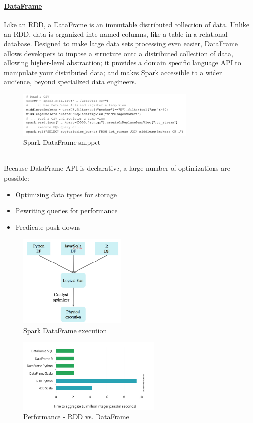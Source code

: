 \documentclass[10pt,a4paper]{article}
\begin{document}
 \paragraph{\uline{DataFrame}}
 Like an RDD, a DataFrame is an immutable distributed collection of data. Unlike an RDD, data is organized into named columns, like a table in a relational database. Designed to make large data sets processing even easier, DataFrame allows developers to impose a structure onto a distributed collection of data, allowing higher-level abstraction; it provides a domain specific language API to manipulate your distributed data; and makes Spark accessible to a wider audience, beyond specialized data engineers.
 \begin{figure}[ht!]
 \hfill \includegraphics[width=250pt]{images/spark-dataframe-snippet}
 \hspace*{\fill}
 \caption{Spark DataFrame snippet}
 \end{figure}  \\
 Because DataFrame API is declarative, a large number of optimizations are possible: 
 \begin{itemize}
 	\item Optimizing data types for storage
 	\item Rewriting queries for performance
 	\item Predicate push downs
 \end{itemize}
 \begin{figure}[ht!]
 \hfill \includegraphics[width=150pt]{images/spark-dataframe-exec}
 \hspace*{\fill}
 \caption{Spark DataFrame execution}
 \end{figure} 
  \begin{figure}[ht!]
 \hfill \includegraphics[width=200pt]{images/spark-rdd-vs-dataframe}
 \hspace*{\fill}
 \caption{Performance - RDD vs. DataFrame}
 \end{figure} 
\end{document}
